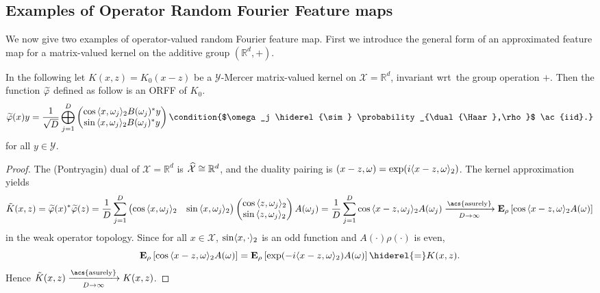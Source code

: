 \subsection{Examples of Operator Random Fourier Feature maps}
\label{subsec:examples_ORFF} We now give two examples of operator-valued random
Fourier feature map. First we introduce the general form of an
approximated feature map for a matrix-valued kernel on the additive group
$(\mathbb{R}^d,+)$.
\begin{example}
    \label{ex:additive_group} In the following let $K(x,z)=K_0(x-z)$ be a
    $\mathcal{Y}$-Mercer matrix-valued kernel on $\mathcal{X}=\mathbb{R}^d$,
    invariant \acs{wrt}~the group operation $+$. Then the function
    $\tildePhi{\omega}$ defined as follow is an \acl{ORFF} of $K_{0}$.
    \begin{dmath*}
        \tildePhi{\omega}(x)y=\frac{1}{\sqrt{D}}\Vect_{j=1}^D
        \begin{pmatrix}
            \cos{\inner{x,\omega_j}_2}B(\omega_j)^\adjoint y \\ 
            \sin{\inner{x,\omega_j}_2}B(\omega_j)^\adjoint y
        \end{pmatrix}
        \condition{$\omega_j \hiderel{\sim} \probability_{\dual{\Haar},\rho}$
        \ac{iid}.}
    \end{dmath*}
    for all $y\in\mathcal{Y}$.
\end{example}
\begin{proof}
    The (Pontryagin) dual of $\mathcal{X}=\mathbb{R}^d$ is
    $\widehat{\mathcal{X}}\cong\mathbb{R}^d$, and the duality pairing is
    $(x-z,\omega)=\exp(i\langle x-z, \omega\rangle_2)$. The kernel
    approximation yields
    \begin{dmath*}
        \tilde{K}(x,z)=\tildePhi{\omega}(x)^\adjoint \tildePhi{\omega}(z)
        = \frac{1}{D} \sum_{j=1}^D \begin{pmatrix} \cos{\inner{x,\omega_j}_2} &
        \sin{\inner{x,\omega_j}_2}
        \end{pmatrix}\begin{pmatrix}\cos{\inner{z,\omega_j}_2} \\
        \sin{\inner{z,\omega_j}_2} \end{pmatrix} A(\omega_j)
        = \frac{1}{D} \sum_{j=1}^D \cos{\inner{x-z,\omega_j}_2}A(\omega_j) \\
        \converges{\acs{asurely}}{D \to \infty} \expectation_\rho
        \left[\cos{\inner{x - z,\omega}_2} A(\omega)\right]
    \end{dmath*}
    in the weak operator topology. Since for all $x\in\mathcal{X}$,
    $\sin\langle x, \cdot\rangle_2$ is an odd function and $A(\cdot)\rho(\cdot)$ is
    even,
    \begin{dmath*}
        \expectation_\rho\left[\cos{\inner{x-z,\omega}_2}A(\omega)\right]
        = \expectation_\rho \left[\exp(-i\inner{x-z,\omega}_2)A(\omega)\right]
        \hiderel{=}K(x,z).
    \end{dmath*}
    Hence $\tilde{K}(x,z)\converges{\acs{asurely}}{D\to\infty}K(x,z)$.
\end{proof}
